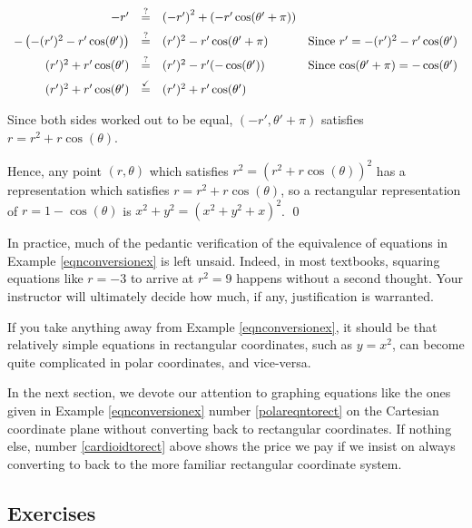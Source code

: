 \documentclass{ximera}
\begin{document}
\begin{example}
\begin{enumerate}
\begin{enumerate}
\[\begin{array}{rclr}
-r' & \stackrel{\text{?}}{=}  & \left(-r'\right)^2 + \left(-r' \cos(\theta' + \pi)\right) & \\ [5pt]

-\left(-(r')^2 - r'\cos(\theta') \right)   & \stackrel{\text{?}}{=}  & (r')^2 - r' \cos(\theta' + \pi) & \text{Since $r' = -(r')^{2} - r'\cos(\theta')$} \\[5pt]

(r')^2 + r'\cos(\theta') & \stackrel{\text{?}}{=}  & (r')^2 - r' (- \cos(\theta')) & \text{Since $\cos(\theta' + \pi) = -\cos(\theta')$} \\[5pt]

(r')^2 + r'\cos(\theta') & \stackrel{\text{\checkmark}}{=}  & (r')^2 + r' \cos(\theta') & \\

\end{array} \]

Since both sides worked out to be equal, $(-r', \theta' + \pi)$ satisfies $r = r^2 + r\cos(\theta)$.  

\smallskip

Hence,  any point $(r,\theta)$ which satisfies $r^2 = \left(r^2 + r\cos(\theta)\right)^2$ has a representation which satisfies  $r = r^2 + r\cos(\theta)$, so a rectangular representation of $r = 1 - \cos(\theta)$ is $x^2 + y^2 = \left(x^2 + y^2 + x\right)^2$.  \qed

\end{enumerate}

\end{enumerate}

\end{example}

In practice, much of the pedantic verification of the equivalence of equations in Example \ref{eqnconversionex} is left unsaid.  Indeed, in most textbooks, squaring equations like $r=-3$ to arrive at $r^2=9$ happens without a second thought. Your instructor will ultimately decide how much, if any, justification is warranted.

\smallskip

If you take anything away from Example \ref{eqnconversionex}, it should be that relatively simple equations in rectangular coordinates, such as $y = x^2$, can become quite complicated in polar coordinates, and vice-versa.  

\smallskip

In the next section, we devote our attention to graphing equations like the ones given in Example \ref{eqnconversionex} number \ref{polareqntorect} on the Cartesian coordinate plane without converting back to rectangular coordinates.  If nothing else, number \ref{cardioidtorect} above shows the price we pay if we insist on always converting to back to the more familiar rectangular coordinate system.

\newpage

\subsection{Exercises}



\closegraphsfile
\end{document}
